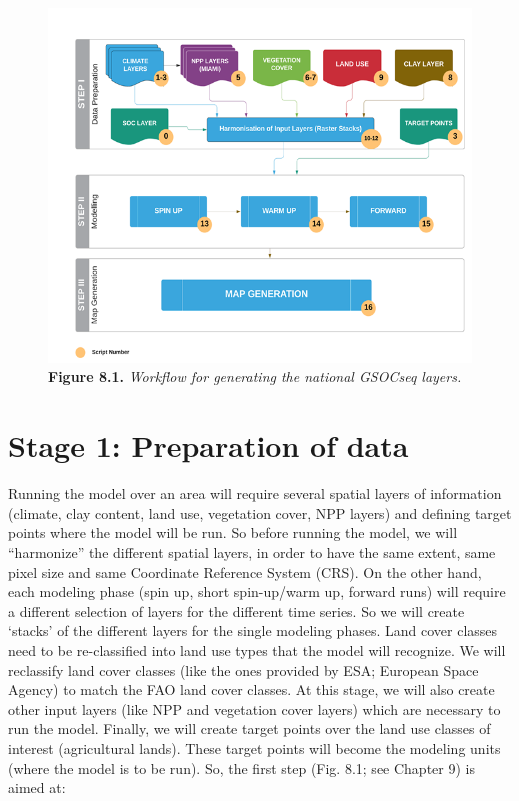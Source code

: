 \documentclass[
  10pt,
  b5paper,
]{book}
\begin{document}
\begin{figure}
\centering
\includegraphics{images/Figure_8.1.png}
\caption{\textbf{Figure 8.1.} \emph{Workflow for generating the national GSOCseq layers.}}
\end{figure}

\hypertarget{stage-1-preparation-of-data}{%
\section{Stage 1: Preparation of data}\label{stage-1-preparation-of-data}}

Running the model over an area will require several spatial layers of information (climate, clay content, land use, vegetation cover, NPP layers) and defining target points where the model will be run. So before running the model, we will ``harmonize'' the different spatial layers, in order to have the same extent, same pixel size and same Coordinate Reference System (CRS). On the other hand, each modeling phase (spin up, short spin-up/warm up, forward runs) will require a different selection of layers for the different time series. So we will create `stacks' of the different layers for the single modeling phases.
Land cover classes need to be re-classified into land use types that the model will recognize. We will reclassify land cover classes (like the ones provided by ESA; European Space Agency) to match the FAO land cover classes.
At this stage, we will also create other input layers (like NPP and vegetation cover layers) which are necessary to run the model.
Finally, we will create target points over the land use classes of interest (agricultural lands). These target points will become the modeling units (where the model is to be run). So, the first step (Fig. 8.1; see Chapter 9) is aimed at:
\end{document}

